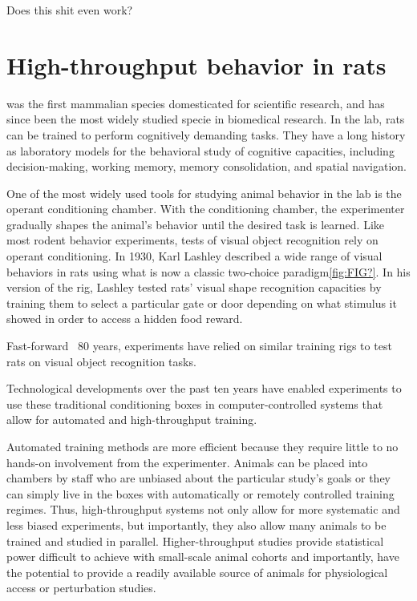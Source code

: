 \begin{savequote}[75mm]
Does this shit even work?
\end{savequote}

\chapter{High-throughput behavior in rats}

 was the first mammalian species domesticated for scientific research\cite{Jacob199}, and has since been the most widely studied specie in biomedical research. In the lab, rats can be trained to perform cognitively demanding tasks. They have a long history as laboratory models for the behavioral study of cognitive capacities, including decision-making\cite{Brunton2013, REFREF}, working memory\cite{REFREF}, memory consolidation\cite{REF}, and spatial navigation\cite{REFREF}. 

One of the most widely used tools for studying animal behavior in the lab is the operant conditioning chamber\cite{REFREF}. With the conditioning chamber, the experimenter gradually shapes the animal's behavior until the desired task is learned. Like most rodent behavior experiments, tests of visual object recognition rely on operant conditioning. In 1930, Karl Lashley\cite{Lashley1930} described a wide range of visual behaviors in rats using what is now a classic two-choice paradigm\ref{fig:FIG?}. In his version of the rig, Lashley tested rats' visual shape recognition capacities by training them to select a particular gate or door depending on what stimulus it showed in order to access a hidden food reward. 

Fast-forward ~80 years, experiments have relied on similar training rigs to test rats on visual object recognition tasks\cite{Zoccolan2009, ETC}. 

Technological developments over the past ten years have enabled experiments to use these traditional conditioning boxes in computer-controlled systems that allow for automated and high-throughput training. 

Automated training methods are more efficient because they require little to no hands-on involvement from the experimenter. Animals can be placed into chambers by staff who are unbiased about the particular study's goals or they can simply live in the boxes with automatically or remotely controlled training regimes\cite{MouseAcademy, Raj, Brody}. Thus, high-throughput systems not only allow for more systematic and less biased experiments, but importantly, they also allow many animals to be trained and studied in parallel. Higher-throughput studies provide statistical power difficult to achieve with small-scale animal cohorts and importantly, have the potential to provide a readily available source of animals for physiological access or perturbation studies.


